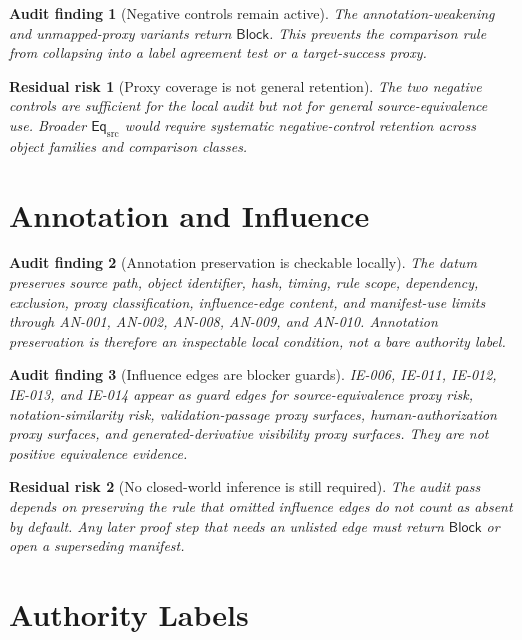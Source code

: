 \documentclass[11pt]{article}
\newcommand{\EqSrc}{\mathsf{Eq}_{\mathrm{src}}}
\newcommand{\Block}{\mathsf{Block}}
\newtheorem{auditfinding}{Audit finding}
\newtheorem{residualrisk}{Residual risk}
\begin{document}
\begin{auditfinding}[Negative controls remain active]
The annotation-weakening and unmapped-proxy variants return \(\Block\).
This prevents the comparison rule from collapsing into a label agreement
test or a target-success proxy.
\end{auditfinding}

\begin{residualrisk}[Proxy coverage is not general retention]
The two negative controls are sufficient for the local audit but not for
general source-equivalence use. Broader \(\EqSrc\) would require systematic
negative-control retention across object families and comparison classes.
\end{residualrisk}

\section{Annotation and Influence}

\begin{auditfinding}[Annotation preservation is checkable locally]
The datum preserves source path, object identifier, hash, timing, rule
scope, dependency, exclusion, proxy classification, influence-edge content,
and manifest-use limits through AN-001, AN-002, AN-008, AN-009, and
AN-010. Annotation preservation is therefore an inspectable local condition,
not a bare authority label.
\end{auditfinding}

\begin{auditfinding}[Influence edges are blocker guards]
IE-006, IE-011, IE-012, IE-013, and IE-014 appear as guard edges for
source-equivalence proxy risk, notation-similarity risk,
validation-passage proxy surfaces, human-authorization proxy surfaces, and
generated-derivative visibility proxy surfaces. They are not positive
equivalence evidence.
\end{auditfinding}

\begin{residualrisk}[No closed-world inference is still required]
The audit pass depends on preserving the rule that omitted influence edges
do not count as absent by default. Any later proof step that needs an
unlisted edge must return \(\Block\) or open a superseding manifest.
\end{residualrisk}

\section{Authority Labels}
\end{document}
